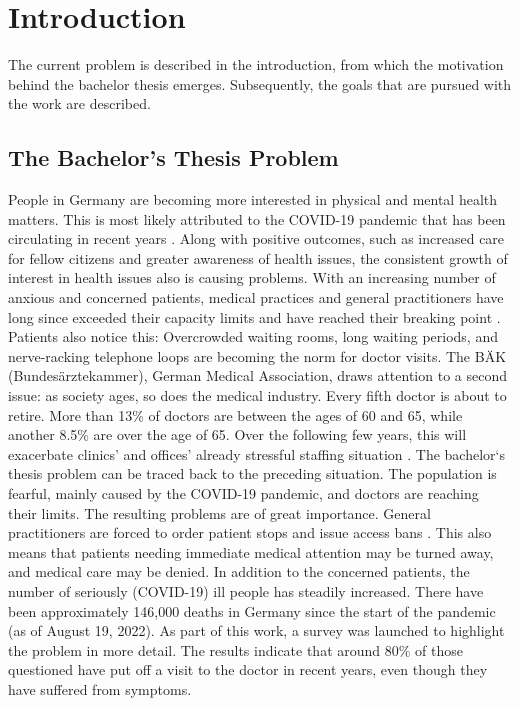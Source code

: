 

\chapter{Introduction}
The current problem is described in the introduction, from which the motivation behind the bachelor thesis emerges. Subsequently, the goals that are pursued with the work are described.

\section{The Bachelor's Thesis Problem}
People in Germany are becoming more interested in physical and mental health matters. This is most likely attributed to the COVID-19 pandemic that has been circulating in recent years \cite{.bahn-bonn}. Along with positive outcomes, such as increased care for fellow citizens \cite{.bahn-bonn} and greater awareness of health issues, the consistent growth of interest in health issues also is causing problems. With an increasing number of anxious and concerned patients, medical practices and general practitioners have long since exceeded their capacity limits and have reached their breaking point \cite{.sok}. Patients also notice this: Overcrowded waiting rooms, long waiting periods, and nerve-racking telephone loops are becoming the norm for doctor visits. The BÄK (Bundesärztekammer), German Medical Association, draws attention to a second issue: as society ages, so does the medical industry. Every fifth doctor is about to retire. More than 13\% of doctors are between the ages of 60 and 65, while another 8.5\% are over the age of 65. Over the following few years, this will exacerbate clinics' and offices' already stressful staffing situation \cite{.blatt}. 
The bachelor`s thesis problem can be traced back to the preceding situation. The population is fearful, mainly caused by the COVID-19 pandemic, and doctors are reaching their limits. The resulting problems are of great importance. General practitioners are forced to order patient stops and issue access bans \cite{.sok}. This also means that patients needing immediate medical attention may be turned away, and medical care may be denied. In addition to the concerned patients, the number of seriously (COVID-19) ill people has steadily increased. There have been approximately 146,000 deaths in Germany since the start of the pandemic (as of August 19, 2022). \cite{.rki} As part of this work, a survey was launched to highlight the problem in more detail. The results indicate that around 80\% of those questioned have put off a visit to the doctor in recent years, even though they have suffered from symptoms.
